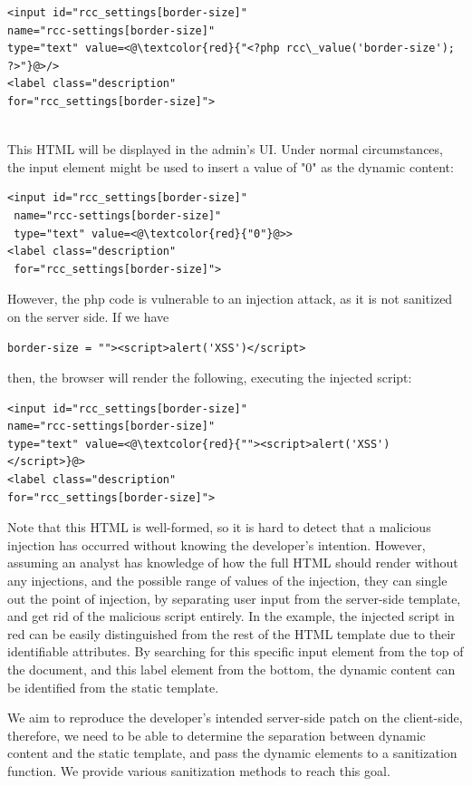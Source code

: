 \begin{lstlisting}
<input id="rcc_settings[border-size]" 
name="rcc-settings[border-size]" 
type="text" value=<@\textcolor{red}{"<?php rcc\_value('border-size'); ?>"}@>/>
<label class="description"
for="rcc_settings[border-size]">
\end{lstlisting}
\
\\
This HTML will be displayed in the admin's UI. Under normal circumstances, the input element might be used to insert a value of "0" as the dynamic content:
\\
\begin{lstlisting}
<input id="rcc_settings[border-size]" 
 name="rcc-settings[border-size]" 
 type="text" value=<@\textcolor{red}{"0"}@>>
<label class="description"
 for="rcc_settings[border-size]">
\end{lstlisting}
However, the php code is vulnerable to an injection attack, as it is not sanitized on the server side. If we have
\begin{lstlisting}
border-size = ""><script>alert('XSS')</script>
\end{lstlisting}
then, the browser will render the following, executing the injected script:
\begin{lstlisting}
<input id="rcc_settings[border-size]" 
name="rcc-settings[border-size]" 
type="text" value=<@\textcolor{red}{""><script>alert('XSS')</script>}@>
<label class="description"
for="rcc_settings[border-size]">
\end{lstlisting}

Note that this HTML is well-formed, so it is hard to detect that a malicious injection has occurred without knowing the developer's intention. However, assuming an analyst has knowledge of how the full HTML should render without any injections, and the possible range of values of the injection, they can single out the point of injection, by separating user input from the server-side template, and get rid of the malicious script entirely. In the example, the injected script in red can be easily distinguished from the rest of the HTML template due to their identifiable attributes. By searching for this specific input element from the top of the document, and this label element from the bottom, the dynamic content can be identified from the static template.

We aim to reproduce the developer's intended server-side patch on the client-side, therefore, we need to be able to determine the separation between dynamic content and the static template, and pass the dynamic elements to a sanitization function. We provide various sanitization methods to reach this goal.

